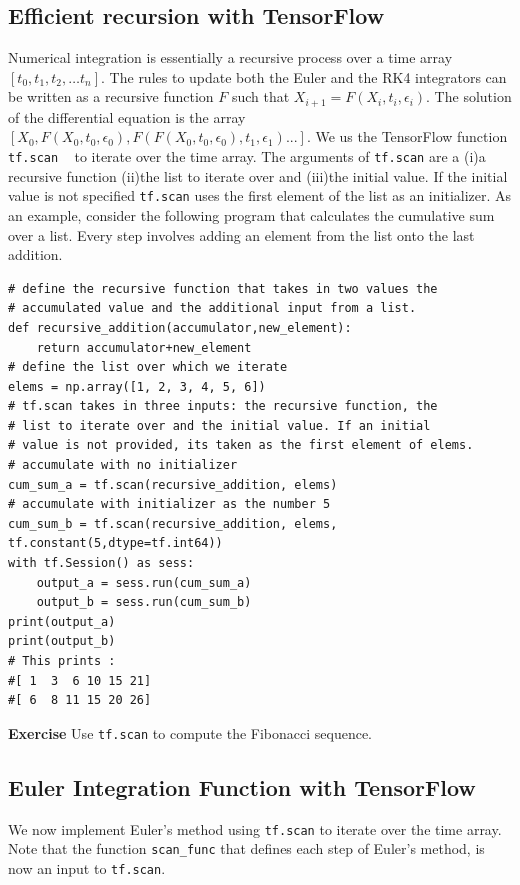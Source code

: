 \documentclass[10pt,letterpaper]{article}
\begin{document}
\begin{nolinenumbers}
\subsection*{Efficient recursion with TensorFlow}
Numerical integration is essentially a recursive process over a time array $[t_{0},t_{1},t_{2},\dots t_{n}]$. The rules to update both the Euler and the RK4 integrators can be written as a recursive function $F$ such that $X_{i+1}=F(X_i,t_i,\epsilon_i)$. The solution of the differential equation is the array $[X_0,F(X_0,t_0,\epsilon_0),F(F(X_0,t_0,\epsilon_0),t_1,\epsilon_1)...]$. We us the TensorFlow function \texttt{tf.scan} ~\cite{tensorflow-api-docs} to iterate over the time array. The arguments of \texttt{tf.scan} are a (i)a recursive function (ii)the list to iterate over and (iii)the initial value. If the initial value is not specified \texttt{tf.scan} uses the first element of the list as an initializer. As an example, consider the following program that  calculates the cumulative sum over a list. Every step involves adding an element from the list onto the last addition. 

\begin{verbatim}
# define the recursive function that takes in two values the
# accumulated value and the additional input from a list.
def recursive_addition(accumulator,new_element):
    return accumulator+new_element
# define the list over which we iterate
elems = np.array([1, 2, 3, 4, 5, 6])
# tf.scan takes in three inputs: the recursive function, the 
# list to iterate over and the initial value. If an initial 
# value is not provided, its taken as the first element of elems.
# accumulate with no initializer
cum_sum_a = tf.scan(recursive_addition, elems) 
# accumulate with initializer as the number 5
cum_sum_b = tf.scan(recursive_addition, elems, tf.constant(5,dtype=tf.int64))
with tf.Session() as sess:
    output_a = sess.run(cum_sum_a)
    output_b = sess.run(cum_sum_b)
print(output_a)
print(output_b)
# This prints :
#[ 1  3  6 10 15 21]
#[ 6  8 11 15 20 26]
\end{verbatim}

\textbf{Exercise} Use \texttt{tf.scan} to compute the Fibonacci sequence. 

\subsection*{Euler Integration Function with TensorFlow}
We now implement Euler's method using \texttt{tf.scan} to iterate over the time array. Note that the function \texttt{scan\_func} that defines each step of Euler's method, is now an input to \texttt{tf.scan}.


\end{nolinenumbers}
\end{document}
